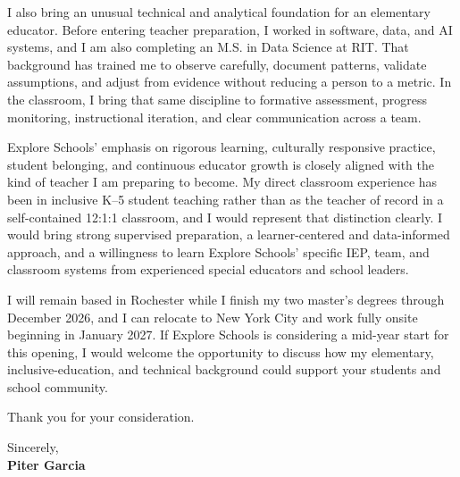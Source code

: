 \documentclass[11pt,letterpaper]{article}
\begin{document}
I also bring an unusual technical and analytical foundation for an elementary
educator. Before entering teacher preparation, I worked in software, data, and
AI systems, and I am also completing an M.S. in Data Science at RIT. That
background has trained me to observe carefully, document patterns, validate
assumptions, and adjust from evidence without reducing a person to a metric. In
the classroom, I bring that same discipline to formative assessment, progress
monitoring, instructional iteration, and clear communication across a team.

Explore Schools' emphasis on rigorous learning, culturally responsive practice,
student belonging, and continuous educator growth is closely aligned with the
kind of teacher I am preparing to become. My direct classroom experience has
been in inclusive K--5 student teaching rather than as the teacher of record in
a self-contained 12:1:1 classroom, and I would represent that distinction
clearly. I would bring strong supervised preparation, a learner-centered and
data-informed approach, and a willingness to learn Explore Schools' specific
IEP, team, and classroom systems from experienced special educators and school
leaders.

I will remain based in Rochester while I finish my two master's degrees through
December 2026, and I can relocate to New York City and work fully onsite
beginning in January 2027. If Explore Schools is considering a mid-year start
for this opening, I would welcome the opportunity to discuss how my elementary,
inclusive-education, and technical background could support your students and
school community.

Thank you for your consideration.

Sincerely,\\[8pt]
\textbf{Piter Garcia}
\end{document}
